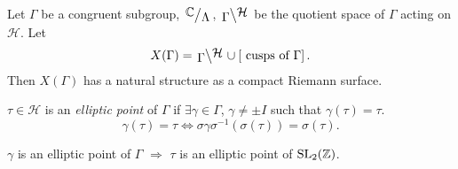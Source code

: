 \begin{proposition}
  Let $\Gamma$ be a congruent subgroup, $\sfrac{\C}{\Lambda}$, $\bsfrac{\Gamma}{\mathcal{H}}$ be the quotient space of $\Gamma$ acting on $\mathcal{H}$. Let 
  \[
    X(\Gamma)= \bsfrac{\Gamma}{\mathcal{H}}\cup \left[ \text{ cusps of }\Gamma \right] .
  \] 
  Then $X(\Gamma)$ has a natural structure as a compact Riemann surface.
\end{proposition}

\begin{definition}
  $\tau \in \mathcal{H}$ is an \textit{elliptic point} of $\Gamma$ if $\exists \gamma \in \Gamma$, $\gamma\neq \pm I$ such that $\gamma(\tau)=\tau$. 
  \[
   \gamma(\tau)=\tau\Leftrightarrow \sigma\gamma\sigma^{-1}\left( \sigma(\tau) \right)=\sigma(\tau) .
  \]
\end{definition}
$\gamma$ is an elliptic point of $\Gamma$ $\Rightarrow$ $\tau $ is an elliptic point of $\operatorname{SL}_2(\mathbb{Z})$.

